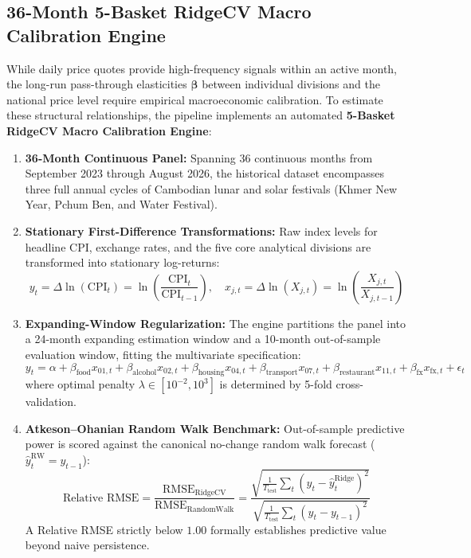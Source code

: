 \subsection{36-Month 5-Basket RidgeCV Macro Calibration Engine}
\hs While daily price quotes provide high-frequency signals within an active month, the long-run pass-through elasticities $\boldsymbol{\beta}$ between individual divisions and the national price level require empirical macroeconomic calibration. To estimate these structural relationships, the pipeline implements an automated \textbf{5-Basket RidgeCV Macro Calibration Engine}:
\begin{enumerate}
    \item \textbf{36-Month Continuous Panel:} Spanning 36 continuous months from September 2023 through August 2026, the historical dataset encompasses three full annual cycles of Cambodian lunar and solar festivals (Khmer New Year, Pchum Ben, and Water Festival).
    \item \textbf{Stationary First-Difference Transformations:} Raw index levels for headline CPI, exchange rates, and the five core analytical divisions are transformed into stationary log-returns:
    \begin{equation}
        y_t = \Delta \ln(\text{CPI}_t) = \ln\left(\frac{\text{CPI}_t}{\text{CPI}_{t-1}}\right), \quad x_{j, t} = \Delta \ln(X_{j, t}) = \ln\left(\frac{X_{j, t}}{X_{j, t-1}}\right)
    \end{equation}
    \item \textbf{Expanding-Window Regularization:} The engine partitions the panel into a 24-month expanding estimation window and a 10-month out-of-sample evaluation window, fitting the multivariate specification:
    \begin{equation}
        y_t = \alpha + \beta_{\text{food}} x_{01, t} + \beta_{\text{alcohol}} x_{02, t} + \beta_{\text{housing}} x_{04, t} + \beta_{\text{transport}} x_{07, t} + \beta_{\text{restaurant}} x_{11, t} + \beta_{\text{fx}} x_{\text{fx}, t} + \epsilon_t
    \end{equation}
    where optimal penalty $\lambda \in [10^{-2}, 10^3]$ is determined by 5-fold cross-validation.
    \item \textbf{Atkeson--Ohanian Random Walk Benchmark:} Out-of-sample predictive power is scored against the canonical no-change random walk forecast ($\hat{y}_{t}^{\text{RW}} = y_{t-1}$):
    \begin{equation}
        \text{Relative RMSE} = \frac{\text{RMSE}_{\text{RidgeCV}}}{\text{RMSE}_{\text{RandomWalk}}} = \frac{\sqrt{\frac{1}{T_{\text{test}}} \sum_{t} (y_t - \hat{y}_t^{\text{Ridge}})^2}}{\sqrt{\frac{1}{T_{\text{test}}} \sum_{t} (y_t - y_{t-1})^2}}
    \end{equation}
    A Relative RMSE strictly below $1.00$ formally establishes predictive value beyond naive persistence.
\end{enumerate}

